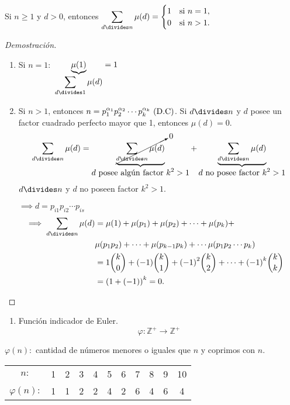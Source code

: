 \begin{theorem}
	Si $n\geq1$ y $d>0$, entonces $\displaystyle\sum_{d\divides n}\mu(d)= 
	\begin{cases}
	1 & \text{si } n=1,\\
	0 &\text{si } n>1.
	\end{cases}$

\begin{proof}[Demostración]
	\begin{enumerate}
		\item Si $n=1\colon$ $\underbrace{\mu(1)}_{\displaystyle\sum_{d\divides 1}\mu(d)}=1$ \checkmark
		
		\item Si $n>1$, entonces $n={p}^{\alpha_1}_{1}{p}^{\alpha_2}_{2}\cdots{p}^{\alpha_k}_{k}\text{ (D.C)}$. Si $d\divides n$ y $d$ posee un factor cuadrado perfecto mayor que 1, entonces $\mu(d)=0$.
		\[
		\sum_{d\divides n}\mu(d)=\underbrace{\cancelto{0}{\sum_{d\divides n}\mu(d)}}_{\displaystyle d\text{ posee algún factor }k^{2}>1}+\underbrace{\sum_{d\divides n}\mu(d)}_{\displaystyle d\text{ no posee factor }k^{2}>1}
		\]
		$d\divides n$ y $d$ no poseen factor $k^{2}>1$.
		
		$\displaystyle\implies d=p_{i1}p_{i2}\cdots p_{is}$
		\begin{align*}
		\implies \sum_{d\divides n}\mu(d)
		&=\mu(1)+\mu(p_1)+\mu(p_2)+\cdots+\mu(p_k)+&\\
		& \mu(p_1p_2)+\cdots+\mu(p_{k-1}p_{k})+\cdots\mu(p_1p_2\cdots p_k)&\\
		&=1\binom{k}{0}+(-1)\binom{k}{1}+{(-1)}^{2}\binom{k}{2}+\cdots+{(-1)}^{k}\binom{k}{k}&\\
		&={(1+(-1))}^{k}=0.&
		\end{align*}
	\end{enumerate}
\end{proof}
\end{theorem}

\begin{enumerate}
	\item Función indicador de Euler.
	\[\varphi\colon\mathbb{Z}^{+}\longrightarrow\mathbb{Z}^{+}\]
\end{enumerate}

$\varphi(n)\colon$ cantidad de números menores o iguales que $n$ y coprimos con $n$.

\begin{example}
	
\begin{table}[H]
	\centering
	\begin{tabular}{ccccccccccc}
		$n\colon$ &1 &2 &3 & 4 & 5 & 6 & 7 & 8 &9 & 10\\[0.1cm]
		$\varphi(n)\colon$ &1 &1 & 2 &2 & 4 & 2 & 6 & 4 & 6 & 4
	\end{tabular}
\end{table}	

\end{example}


